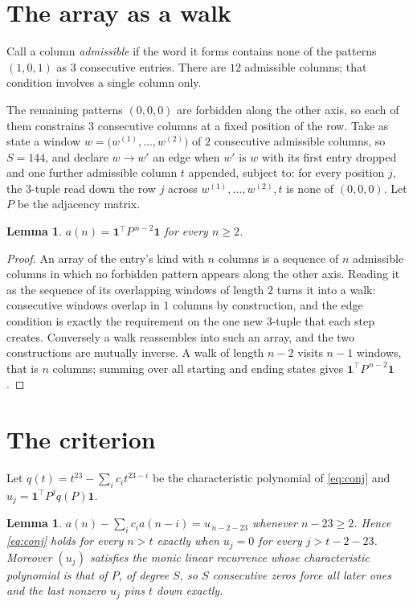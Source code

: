 \documentclass[11pt,a4paper]{article}
\theoremstyle{plain}
\newtheorem{lemma}[theorem]{Lemma}
\theoremstyle{definition}
\begin{document}
\section{The array as a walk}

Call a column \emph{admissible} if the word it forms contains none of the patterns
$(1,0,1)$ as $3$ consecutive entries. There are $12$ admissible columns; that condition
involves a single column only.

The remaining patterns $(0,0,0)$ are forbidden along the other axis, so each of them
constrains $3$ consecutive columns at a fixed position of the row. Take as state a
window $w=\bigl(w^{(1)},\dots,w^{(2)}\bigr)$ of $2$ consecutive admissible
columns, so $S=144$, and declare $w\to w'$ an edge when $w'$ is $w$ with its first entry
dropped and one further admissible column $t$ appended, subject to: for every position
$j$, the $3$-tuple read down the row $j$ across $w^{(1)},\dots,w^{(2)},t$
is none of $(0,0,0)$. Let $P$ be the adjacency matrix.

\begin{lemma}\label{lem:walk}
$a(n)=\mathbf{1}^{\!\top}P^{\,n-2}\mathbf{1}$ for every $n\ge2$.
\end{lemma}

\begin{proof}
An array of the entry's kind with $n$ columns is a sequence of $n$ admissible columns in
which no forbidden pattern appears along the other axis. Reading it as the sequence of its
overlapping windows of length $2$ turns it into a walk: consecutive windows overlap in
$1$ columns by construction, and the edge condition is exactly the requirement on the one
new $3$-tuple that each step creates. Conversely a walk reassembles into such an array,
and the two constructions are mutually inverse. A walk of length $n-2$ visits $n-1$
windows, that is $n$ columns; summing over all starting and ending states gives
$\mathbf{1}^{\!\top}P^{\,n-2}\mathbf{1}$.
\end{proof}

\section{The criterion}

Let $q(t)=t^{23}-\sum_i c_i t^{23-i}$ be the characteristic polynomial of
\eqref{eq:conj} and $u_j=\mathbf{1}^{\!\top}P^{j}q(P)\mathbf{1}$.

\begin{lemma}\label{lem:crit}
$a(n)-\sum_i c_i a(n-i)=u_{\,n-2-23}$ whenever $n-23\ge2$. Hence
\eqref{eq:conj} holds for every $n>t$ exactly when $u_j=0$ for every
$j>t-2-23$. Moreover $(u_j)$ satisfies the monic linear recurrence whose
characteristic polynomial is that of $P$, of degree $S$, so $S$ consecutive zeros force all
later ones and the last nonzero $u_j$ pins $t$ down exactly.
\end{lemma}
\end{document}
